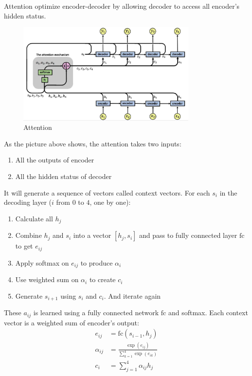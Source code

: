 Attention optimize encoder-decoder by allowing decoder to access all encoder's hidden status.

\begin{figure}[H]
\includegraphics[width=0.8\textwidth]{pic/04/attention.jpeg}
\centering
\caption{Attention}
\end{figure}


As the picture above shows, the attention takes two inputs:
\begin{enumerate}
    \item All the outputs of encoder
    \item All the hidden status of decoder
\end{enumerate}

It will generate a sequence of vectors called context vectors. For each $s_i$ in the decoding layer ($i$ from $0$ to $4$, one by one):
\begin{enumerate}
    \item Calculate all $h_j$
    \item Combine $h_j$ and $s_i$ into a vector $[h_j, s_i]$ and pass to fully connected layer $\mathrm{fc}$ to get $e_{ij}$
    \item Apply softmax on $e_{ij}$ to produce $\alpha_i$
    \item Use weighted sum on $\alpha_i$ to create $c_i$
    \item Generate $s_{i+1}$ using $s_i$ and $c_i$. And iterate again
\end{enumerate}


 These $a_{ij}$ is learned using a fully connected network $\mathrm{fc}$ and softmax. Each context vector is a weighted sum of encoder's output:
\begin{equation}
    \begin{aligned}
        e_{ij} &= \mathrm{fc}(s_{i-1}, h_j) \\
        \alpha_{ij} &= \frac{\exp(e_{ij})}{\displaystyle \sum_{k=1}^4 \exp(e_{ik})} \\
        c_i &= \sum_{j=1}^4 \alpha_{ij} h_j
    \end{aligned}
\end{equation}


